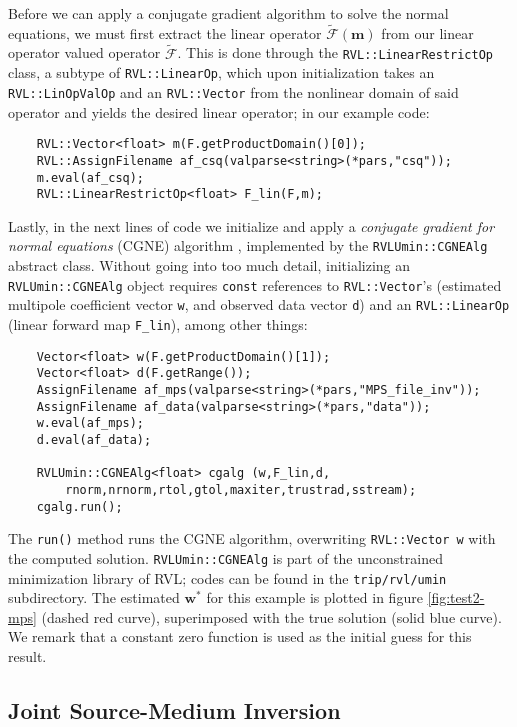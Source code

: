 Before we can apply a conjugate gradient algorithm to solve the normal equations, we must first extract the linear operator $\tilde{\mathcal F}(\mathbf m)$ from our linear operator valued operator $\tilde{\mathcal F}$.
This is done through the {\tt RVL::LinearRestrictOp} class, a subtype of {\tt RVL::LinearOp}, which upon initialization takes an {\tt RVL::LinOpValOp} and an {\tt RVL::Vector} from the nonlinear domain of said operator and yields the desired linear operator;
in our example code:
{\small
\begin{verbatim}
    RVL::Vector<float> m(F.getProductDomain()[0]);
    RVL::AssignFilename af_csq(valparse<string>(*pars,"csq"));
    m.eval(af_csq);
    RVL::LinearRestrictOp<float> F_lin(F,m);
\end{verbatim}
}

Lastly, in the next lines of code we initialize and apply a {\em conjugate gradient for normal equations} (CGNE) algorithm \citep{Paige:82}, implemented by the {\tt RVLUmin::CGNEAlg} abstract class.
Without going into too much detail, initializing an {\tt RVLUmin::CGNEAlg} object requires {\tt const} references to {\tt RVL::Vector}'s (estimated multipole coefficient vector {\tt w}, and observed data vector {\tt d}) and an {\tt RVL::LinearOp} (linear forward map {\tt F\_lin}), among other things:
{\small
\begin{verbatim}
    Vector<float> w(F.getProductDomain()[1]);
    Vector<float> d(F.getRange());
    AssignFilename af_mps(valparse<string>(*pars,"MPS_file_inv"));
    AssignFilename af_data(valparse<string>(*pars,"data"));
    w.eval(af_mps);
    d.eval(af_data);

    RVLUmin::CGNEAlg<float> cgalg (w,F_lin,d,
        rnorm,nrnorm,rtol,gtol,maxiter,trustrad,sstream);
    cgalg.run();

\end{verbatim}
}
The {\tt run()} method runs the CGNE algorithm, overwriting {\tt RVL::Vector w} with the computed solution.
{\tt RVLUmin::CGNEAlg} is part of the unconstrained minimization library of RVL; codes can be found in the {\tt trip/rvl/umin} subdirectory.
The estimated $\mathbf w^*$ for this example is plotted in figure \ref{fig:test2-mps} (dashed red curve), superimposed with the true solution (solid blue curve). 
We remark that a constant zero function is used as the initial guess for this result.


\subsection{Joint Source-Medium Inversion}

